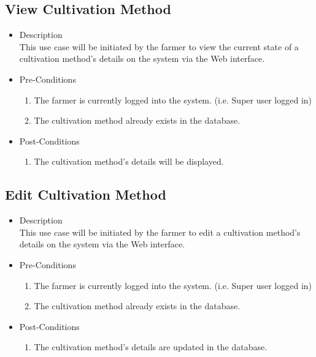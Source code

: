 \documentclass[11pt,fleqn]{book} %
\begin{document}
		\subsection{View Cultivation Method}
		\begin{itemize}
			\item Description\\
			This use case will be initiated by the farmer to view the current state of a cultivation method’s details on the system via the Web interface.
			\item Pre-Conditions
			\begin{enumerate}
				\item The farmer is currently logged into the system. (i.e. Super user logged in)
				\item The cultivation method already exists in the database.		
			\end{enumerate}
			\item Post-Conditions
			\begin{enumerate}
				\item The cultivation method’s details will be displayed.
			\end{enumerate}
		\end{itemize}
		
		\subsection{Edit Cultivation Method}
		\begin{itemize}
			\item Description\\
			This use case will be initiated by the farmer to edit a cultivation method’s details on the system via the Web interface.
			\item Pre-Conditions
			\begin{enumerate}
				\item The farmer is currently logged into the system. (i.e. Super user logged in)
				\item The cultivation method already exists in the database.					
			\end{enumerate}
			\item Post-Conditions
			\begin{enumerate}
				\item The cultivation method’s details are updated in the database.
			\end{enumerate}
		\end{itemize}
		
\end{document}
